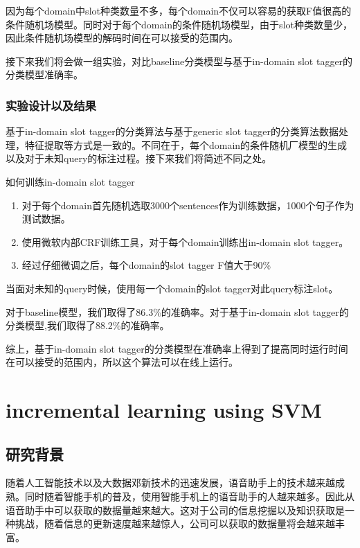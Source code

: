 \documentclass[master]{njuthesis}
\begin{document}
\begin{enumerate}
\begin{enumerate}
\begin{enumerate}
    因为每个domain中slot种类数量不多，每个domain不仅可以容易的获取F值很高的条件随机场模型。同时对于每个domain的条件随机场模型，由于slot种类数量少，因此条件随机场模型的解码时间在可以接受的范围内。
    
    接下来我们将会做一组实验，对比baseline分类模型与基于in-domain slot tagger的分类模型准确率。

\subsection{实验设计以及结果}
    
    基于in-domain slot tagger的分类算法与基于generic slot tagger的分类算法数据处理，特征提取等方式是一致的。不同在于，每个domain的条件随机厂模型的生成以及对于未知query的标注过程。接下来我们将简述不同之处。
   
    如何训练in-domain slot tagger
    \begin{enumerate}
      \item 对于每个domain首先随机选取3000个sentences作为训练数据，1000个句子作为测试数据。
      \item 使用微软内部CRF训练工具，对于每个domain训练出in-domain slot tagger。
      \item 经过仔细微调之后，每个domain的slot tagger F值大于90\%
    \end{enumerate}

    当面对未知的query时候，使用每一个domain的slot tagger对此query标注slot。

    对于baseline模型，我们取得了86.3\%的准确率。对于基于in-domain slot tagger的分类模型,我们取得了88.2\%的准确率。
    
    综上，基于in-domain slot tagger的分类模型在准确率上得到了提高同时运行时间在可以接受的范围内，所以这个算法可以在线上运行。


\chapter{incremental learning using SVM}\label{chapter_smallworld}

\section{研究背景}

   随着人工智能技术以及大数据邓新技术的迅速发展，语音助手上的技术越来越成熟。同时随着智能手机的普及，使用智能手机上的语音助手的人越来越多。因此从语音助手中可以获取的数据量越来越大。这对于公司的信息挖掘以及知识获取是一种挑战，随着信息的更新速度越来越惊人，公司可以获取的数据量将会越来越丰富。
   

\end{enumerate}
\end{enumerate}
\end{enumerate}
\end{document}
